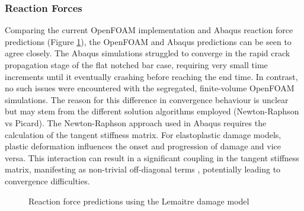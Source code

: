 \documentclass[sn-mathphys,Numbered]{sn-jnl}%
\begin{document}
\subsubsection{Reaction Forces}
Comparing the current OpenFOAM implementation and Abaqus reaction force predictions (Figure \ref{fig:lemaitre_forces}), the OpenFOAM and Abaqus predictions can be seen to agree closely. 
The Abaqus simulations struggled to converge in the rapid crack propagation stage of the flat notched bar case, requiring very small time increments until it eventually crashing before reaching the end time.
In contrast, no such issues were encountered with the segregated, finite-volume OpenFOAM simulations.
The reason for this difference in convergence behaviour is unclear but may stem from the different solution algorithms employed (Newton-Raphson vs Picard).
The Newton-Raphson approach used in Abaqus requires the calculation of the tangent stiffness matrix.
For elastoplastic damage models, plastic deformation influences the onset and progression of damage and vice versa.
This interaction can result in a significant coupling in the tangent stiffness matrix, manifesting as non-trivial off-diagonal terms \cite{bathe_finite_1996}, potentially leading to convergence difficulties.
\begin{figure}[htbp]
	\centering
		\caption{Reaction force predictions using the Lemaitre damage model}
	\label{fig:lemaitre_forces}
\end{figure}
\end{document}
